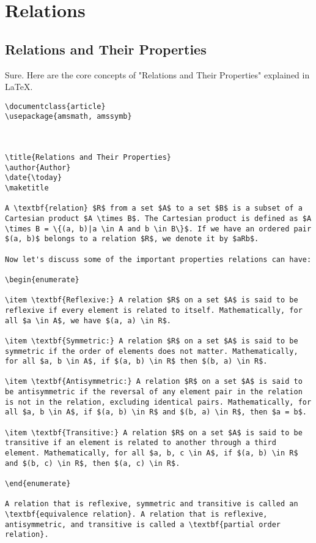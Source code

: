\section{Relations}
\subsection{Relations and Their Properties}
Sure. Here are the core concepts of "Relations and Their Properties" explained in LaTeX.

\begin{verbatim}
\documentclass{article}
\usepackage{amsmath, amssymb}



\title{Relations and Their Properties}
\author{Author}
\date{\today}
\maketitle

A \textbf{relation} $R$ from a set $A$ to a set $B$ is a subset of a Cartesian product $A \times B$. The Cartesian product is defined as $A \times B = \{(a, b)|a \in A and b \in B\}$. If we have an ordered pair $(a, b)$ belongs to a relation $R$, we denote it by $aRb$.

Now let's discuss some of the important properties relations can have:

\begin{enumerate}

\item \textbf{Reflexive:} A relation $R$ on a set $A$ is said to be reflexive if every element is related to itself. Mathematically, for all $a \in A$, we have $(a, a) \in R$.

\item \textbf{Symmetric:} A relation $R$ on a set $A$ is said to be symmetric if the order of elements does not matter. Mathematically, for all $a, b \in A$, if $(a, b) \in R$ then $(b, a) \in R$.

\item \textbf{Antisymmetric:} A relation $R$ on a set $A$ is said to be antisymmetric if the reversal of any element pair in the relation is not in the relation, excluding identical pairs. Mathematically, for all $a, b \in A$, if $(a, b) \in R$ and $(b, a) \in R$, then $a = b$.

\item \textbf{Transitive:} A relation $R$ on a set $A$ is said to be transitive if an element is related to another through a third element. Mathematically, for all $a, b, c \in A$, if $(a, b) \in R$ and $(b, c) \in R$, then $(a, c) \in R$.

\end{enumerate}

A relation that is reflexive, symmetric and transitive is called an \textbf{equivalence relation}. A relation that is reflexive, antisymmetric, and transitive is called a \textbf{partial order relation}.


\end{verbatim}

